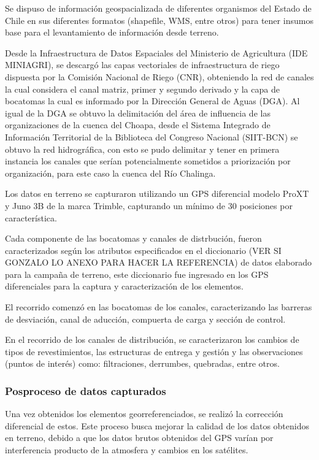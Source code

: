 \documentclass[]{article}
\begin{document}
Se dispuso de información geospacializada de diferentes organismos del Estado de Chile en sus diferentes formatos (shapefile, WMS, entre otros) para tener insumos base para el levantamiento de información desde terreno. 

Desde la Infraestructura de Datos Espaciales del Ministerio de Agricultura (IDE MINIAGRI), se descargó las capas vectoriales de infraestructura de riego dispuesta por la  Comisión Nacional de Riego (CNR), obteniendo la red de canales la cual considera el canal matriz, primer y segundo derivado y la capa de bocatomas la cual es informado por la Dirección General de Aguas (DGA). Al igual de la DGA se obtuvo la delimitación del área de influencia de las organizaciones de la cuenca del Choapa, desde el Sistema Integrado de Información Territorial de la Biblioteca del Congreso Nacional (SIIT-BCN) se obtuvo la red hidrográfica, con esto se pudo delimitar y tener en primera instancia los canales que serían potencialmente sometidos a priorización por organización, para este caso la cuenca del Río Chalinga.

Los datos en terreno se capturaron utilizando un GPS diferencial modelo ProXT y Juno 3B de la marca Trimble, capturando un mínimo de 30 posiciones por característica.

Cada componente de las bocatomas y  canales de distrbución, fueron caracterizados según los atributos especificados en el diccionario (VER SI GONZALO LO ANEXO PARA HACER LA REFERENCIA) de datos elaborado para la campaña de terreno, este diccionario fue ingresado en los GPS diferenciales para la captura y caracterización de los elementos.

El recorrido comenzó en las bocatomas de los canales, caracterizando las barreras de desviación, canal de aducción, compuerta de carga y sección de control. 

En el recorrido de los canales de distribución, se caracterizaron los cambios de tipos de revestimientos, las estructuras de entrega y gestión y las observaciones (puntos de interés) como: filtraciones, derrumbes, quebradas, entre otros.


\subsubsection{Posproceso de datos capturados}

Una vez obtenidos los elementos georreferenciados, se realizó la corrección diferencial de estos. Este proceso busca mejorar la calidad de los datos obtenidos en terreno, debido a que los datos brutos obtenidos del GPS varían por interferencia producto de la atmosfera y cambios en los satélites.
\end{document}
